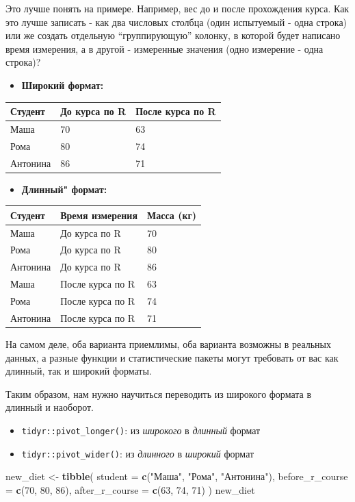 \documentclass[
]{book}
\newenvironment{Shaded}{\begin{snugshade}}{\end{snugshade}}
\newcommand{\DataTypeTok}[1]{\textcolor[rgb]{0.13,0.29,0.53}{#1}}
\newcommand{\DecValTok}[1]{\textcolor[rgb]{0.00,0.00,0.81}{#1}}
\newcommand{\KeywordTok}[1]{\textcolor[rgb]{0.13,0.29,0.53}{\textbf{#1}}}
\newcommand{\NormalTok}[1]{#1}
\newcommand{\StringTok}[1]{\textcolor[rgb]{0.31,0.60,0.02}{#1}}
\providecommand{\tightlist}{%
  \setlength{\itemsep}{0pt}\setlength{\parskip}{0pt}}
\begin{document}
Это лучше понять на примере. Например, вес до и после прохождения курса. Как это лучше записать - как два числовых столбца (один испытуемый - одна строка) или же создать отдельную ``группирующую'' колонку, в которой будет написано время измерения, а в другой - измеренные значения (одно измерение - одна строка)?

\begin{itemize}
\tightlist
\item
  \textbf{Широкий формат:}
\end{itemize}

\begin{longtable}[]{@{}lll@{}}
\toprule
Студент & До курса по R & После курса по R\tabularnewline
\midrule
\endhead
Маша & 70 & 63\tabularnewline
Рома & 80 & 74\tabularnewline
Антонина & 86 & 71\tabularnewline
\bottomrule
\end{longtable}

\begin{itemize}
\tightlist
\item
  \textbf{Длинный" формат:}
\end{itemize}

\begin{longtable}[]{@{}lll@{}}
\toprule
Студент & Время измерения & Масса (кг)\tabularnewline
\midrule
\endhead
Маша & До курса по R & 70\tabularnewline
Рома & До курса по R & 80\tabularnewline
Антонина & До курса по R & 86\tabularnewline
Маша & После курса по R & 63\tabularnewline
Рома & После курса по R & 74\tabularnewline
Антонина & После курса по R & 71\tabularnewline
\bottomrule
\end{longtable}

На самом деле, оба варианта приемлимы, оба варианта возможны в реальных данных, а разные функции и статистические пакеты могут требовать от вас как длинный, так и широкий форматы.

Таким образом, нам нужно научиться переводить из широкого формата в длинный и наоборот.

\begin{itemize}
\item
  \texttt{tidyr::pivot\_longer()}: из \emph{широкого} в \emph{длинный} формат
\item
  \texttt{tidyr::pivot\_wider()}: из \emph{длинного} в \emph{широкий} формат
\end{itemize}

\begin{Shaded}
\begin{Highlighting}[]
\NormalTok{new_diet <-}\StringTok{ }\KeywordTok{tibble}\NormalTok{(}
  \DataTypeTok{student =} \KeywordTok{c}\NormalTok{(}\StringTok{"Маша"}\NormalTok{, }\StringTok{"Рома"}\NormalTok{, }\StringTok{"Антонина"}\NormalTok{),}
  \DataTypeTok{before_r_course =} \KeywordTok{c}\NormalTok{(}\DecValTok{70}\NormalTok{, }\DecValTok{80}\NormalTok{, }\DecValTok{86}\NormalTok{),}
  \DataTypeTok{after_r_course =} \KeywordTok{c}\NormalTok{(}\DecValTok{63}\NormalTok{, }\DecValTok{74}\NormalTok{, }\DecValTok{71}\NormalTok{)}
\NormalTok{)}
\NormalTok{new_diet}
\end{Highlighting}
\end{Shaded}
\end{document}
